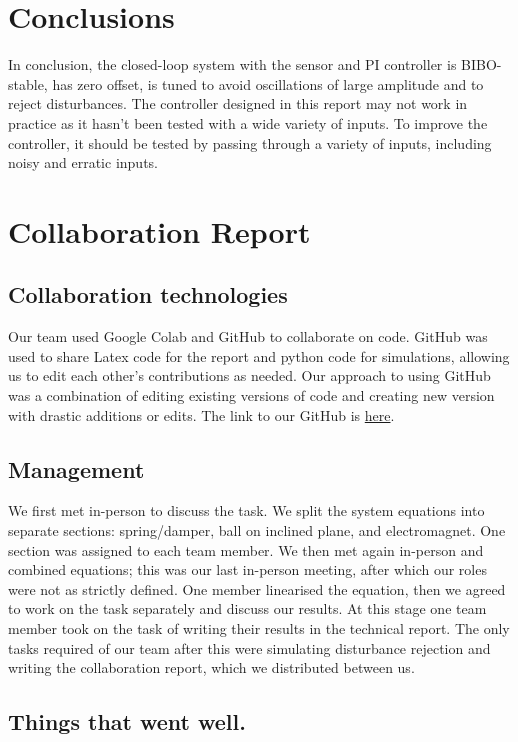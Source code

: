 \documentclass[a4paper,10pt,reqno]{amsart}
\numberwithin{equation}{section}
\begin{document}
\section{Conclusions}
In conclusion, the closed-loop system with the sensor and PI controller is BIBO-stable, has zero offset, is tuned to avoid oscillations of large amplitude and to reject disturbances.
The controller designed in this report may not work in practice as it hasn't been tested with a wide variety of inputs. To improve the controller, it should be tested by passing through a variety of inputs, including noisy and erratic inputs.

\section{Collaboration Report}

\subsection{Collaboration technologies}

Our team used Google Colab and GitHub to collaborate on code. GitHub was used to share Latex code for the report and python code for simulations, allowing us to edit each other’s contributions as needed. Our approach to using GitHub was a combination of editing existing versions of code and creating new version with drastic additions or edits.
The link to our GitHub is \href{https://github.com/omccullough02/ELE_2038_Group}{here}.

\subsection{Management}

We first met in-person to discuss the task. We split the system equations into separate sections: spring/damper, ball on inclined plane, and electromagnet. One section was assigned to each team member. We then met again in-person and combined equations; this was our last in-person meeting, after which our roles were not as strictly defined. One member linearised the equation, then we agreed to work on the task separately and discuss our results. At this stage one team member took on the task of writing their results in the technical report. The only tasks required of our team after this were simulating disturbance rejection and writing the collaboration report, which we distributed between us.

\subsection{Things that went well.}
\end{document}
